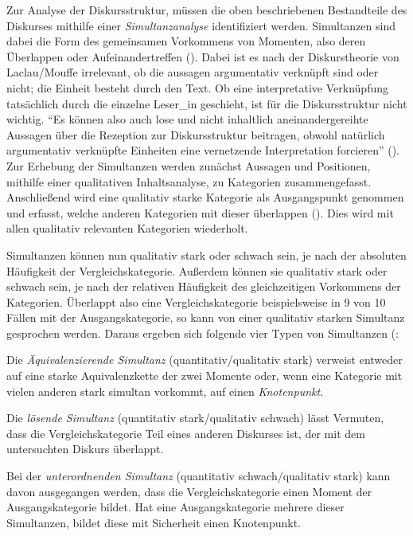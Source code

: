 \documentclass[12pt, titlepage=true, toc=bib]{scrartcl}
\begin{document}
Zur Analyse der Diskursstruktur, müssen die oben beschriebenen Bestandteile des Diskurses mithilfe einer \textit{Simultanzanalyse} identifiziert werden. Simultanzen sind dabei die Form des gemeinsamen Vorkommens von Momenten, also deren Überlappen oder Aufeinandertreffen (\cite[11][vgl.]{bruell_chancen_2006}). Dabei ist es nach der Diskurstheorie von Laclau/Mouffe irrelevant, ob die aussagen argumentativ verknüpft sind oder nicht; die Einheit besteht durch den Text. Ob eine interpretative Verknüpfung tatsächlich durch die einzelne Leser\_in geschieht, ist für die Diskursstruktur nicht wichtig. "`Es können also auch lose und nicht inhaltlich aneinandergereihte Aussagen über die Rezeption zur Diskursstruktur beitragen, obwohl natürlich argumentativ verknüpfte Einheiten eine vernetzende Interpretation forcieren"' (\cite[9]{bruell_chancen_2006}). Zur Erhebung der Simultanzen werden zunächst Aussagen und Positionen, mithilfe einer qualitativen Inhaltsanalyse, zu Kategorien zusammengefasst. Anschließend wird eine qualitativ starke Kategorie als Ausgangspunkt genommen und erfasst, welche anderen Kategorien mit dieser überlappen (\cite[vgl.][205]{nonhoff_kollektive_2007}). Dies wird mit allen qualitativ relevanten Kategorien wiederholt.

Simultanzen können nun qualitativ stark oder schwach sein, je nach der absoluten Häufigkeit der Vergleichskategorie. Außerdem können sie qualitativ stark oder schwach sein, je nach der relativen Häufigkeit des gleichzeitigen Vorkommens der Kategorien. Überlappt also eine Vergleichskategorie beispielsweise in 9 von 10 Fällen mit der Ausgangskategorie, so kann von einer qualitativ starken Simultanz gesprochen werden. Daraus ergeben sich folgende vier Typen von Simultanzen (\cite[vgl.][12]{bruell_chancen_2006}:

\noindent Die \textit{Äquivalenzierende Simultanz} (quantitativ/qualitativ stark) verweist entweder auf eine starke Aquivalenzkette der zwei Momente oder, wenn eine Kategorie mit vielen anderen stark simultan vorkommt, auf einen \textit{Knotenpunkt}.

\noindent Die \textit{lösende Simultanz} (quantitativ stark/qualitativ schwach) lässt Vermuten, dass die Vergleichskategorie Teil eines anderen Diskurses ist, der mit dem untersuchten Diskurs überlappt.

\noindent Bei der \textit{unterordnenden Simultanz} (quantitativ schwach/qualitativ stark) kann davon ausgegangen werden, dass die Vergleichskategorie einen Moment der Ausgangskategorie bildet. Hat eine Ausgangskategorie mehrere dieser Simultanzen, bildet diese mit Sicherheit einen Knotenpunkt.
\end{document}
